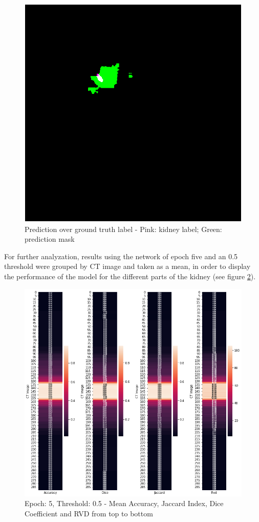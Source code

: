  \begin{figure}
 \centering
 \includegraphics[width=0.3\linewidth]{PICs/kidneyMask.png}
 \caption{Prediction over ground truth label - Pink: kidney label; Green: prediction mask}
 \label{fig:kidneyMask}
 \end{figure}
 
 
For further analyzation, results using the network of epoch five and an 0.5 threshold were grouped by CT image and taken as a mean, in order to display  the performance of  the model for the different parts of the kidney (see figure \ref{fig:align}).
 \begin{figure}
 \centering
 \includegraphics[width=0.5\linewidth]{PICs/align.png}
 \caption{Epoch: 5, Threshold: 0.5 - Mean  Accuracy, Jaccard Index, Dice Coefficient and RVD from top to bottom}
 \label{fig:align}
 \end{figure}
 
